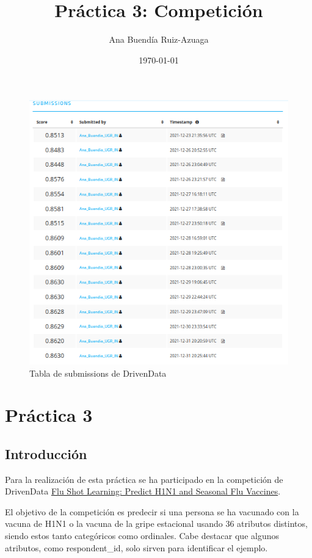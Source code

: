 \documentclass[twoside,openright,titlepage,numbers=noenddot,openany,headinclude,footinclude=true,
cleardoublepage=empty,abstractoff,BCOR=5mm,paper=a4,fontsize=12pt,main=spanish]{scrreprt}
\author{Ana Buendía Ruiz-Azuaga}
\date{\today}
\title{Práctica 3: Competición}
\begin{document}
\maketitle


{}

\begin{figure}
\includegraphics[scale=1]{submissions.png}
\caption{Tabla de submissions de DrivenData}
\end{figure}

\newpage
\tableofcontents
\newpage

\chapter{Práctica 3}
\section{Introducción}

Para la realización de esta práctica se ha participado en la competición de DrivenData \href{https://www.drivendata.org/competitions/66/flu-shot-learning/}{Flu Shot Learning: Predict H1N1 and Seasonal Flu Vaccines}.

El objetivo de la competición es predecir si una persona se ha vacunado con la vacuna de H1N1 o la vacuna de la gripe estacional usando 36 atributos distintos, siendo estos tanto categóricos como ordinales. Cabe destacar que algunos atributos, como respondent\_id, solo sirven para identificar el ejemplo.
\end{document}

